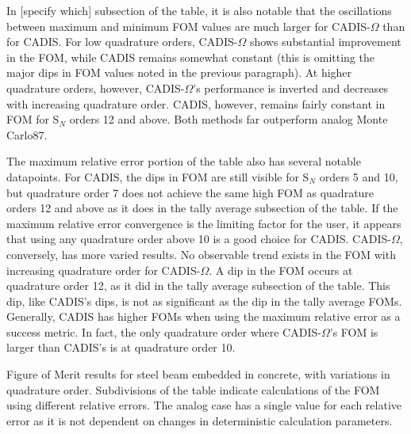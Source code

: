 In [specify which] subsection of the table, it is also notable that the oscillations between
maximum and minimum FOM values are much larger for CADIS-$\Omega$ than for CADIS.
For low quadrature orders, CADIS-$\Omega$ shows substantial improvement in the
FOM, while CADIS remains somewhat constant (this is omitting the major dips in FOM
values noted in the previous paragraph). At higher quadrature orders, however,
CADIS-$\Omega$'s performance is inverted and decreases with increasing
quadrature order. CADIS, however, remains fairly constant in FOM for S$_N$
orders 12 and above. Both methods far outperform analog Monte
Carlo87.

The maximum relative error portion of the table also has several notable
datapoints. For CADIS, the dips in FOM are still visible for S$_N$ orders 5 and
10, but quadrature order 7 does not achieve the same high FOM as quadrature
orders 12 and above as it does in the tally average subsection of the table. If
the maximum relative error convergence is the limiting factor for the user,
it appears that using any quadrature order above 10 is a good choice for CADIS.
CADIS-$\Omega$, conversely, has more varied results. No observable trend exists
in the FOM with increasing quadrature order for CADIS-$\Omega$. A dip
in the FOM occurs at quadrature order 12, as it did in the tally average
subsection of the table. This dip, like CADIS's dips, is not as significant as
the dip in the tally average FOMs. Generally, CADIS has higher FOMs when using
the maximum relative error as a success metric. In fact, the only quadrature order where
CADIS-$\Omega$'s FOM is larger than CADIS's is at quadrature order 10.


\begin{table}[h!]
  \centering
  
  \caption[Figure of Merit results for steel beam embedded in concrete, with
  variations in quadrature order.]{Figure of Merit results for steel beam embedded in concrete, with
  variations in quadrature order. Subdivisions of the table indicate
calculations of the FOM using different relative errors. The analog case has a
single value for each relative error as it is not dependent on changes in
deterministic calculation parameters.}
  \label{tab:quad_foms}
\end{table}

